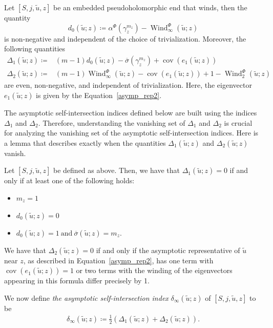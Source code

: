 \documentclass[11pt, a4paper]{amsart}
\DeclareMathOperator{\wind}{Wind}
\DeclareMathOperator{\cov}{cov}
\begin{document}
\begin{lemma} \label{delta1}\cite[Subsection~3.1]{Siefinter2009}
Let $[S,j,\tilde{u},z]$ be an embedded pseudoholomorphic end that winds, then the quantity
$$d_0(\tilde{u} ; z) \coloneqq \alpha^{\Phi}(\gamma_z^{m_z}) -\wind_{\infty}^{\Phi}(\tilde{u}; z)$$
is non-negative and independent of the choice of trivialization. Moreover, the following quantities
\[\begin{array}{ll}
\Delta_1 (\tilde{u}; z)\coloneqq& (m- 1)d_0(\tilde{u}; z)- \overline{\sigma}(\gamma_z^{m_z}) + \cov\left(e_1 (\tilde{u}; z)\right)\\
\Delta_2 (\tilde{u}; z) \coloneqq & (m-1) \wind^{\Phi}_{\infty}(\tilde{u}; z) - \cov\left(e_1 (\tilde{u}; z)\right) + 1 - \wind_2^{\Phi} (\tilde{u}; z)
\end{array}\]
are even, non-negative, and independent of trivialization. Here, the eigenvector $e_1(\tilde{u}; z)$ is given by the Equation~\ref{asymp_rep2}.
\end{lemma}

The asymptotic self-intersection indices defined below are built using the indices $\Delta_1$ and $\Delta_2$. Therefore, understanding the vanishing set of $\Delta_1$ and $\Delta_2$ is crucial for analyzing the vanishing set of the asymptotic self-intersection indices. Here is a lemma that describes exactly when the quantities $\Delta_1 (\tilde{u}; z)$ and $\Delta_2 (\tilde{u}; z)$ vanish. 

\begin{lemma}\cite[Section~3.1]{Siefinter2009} \label{self-intersction=0}
Let $[S,j,\tilde{u},z]$ be defined as above. Then, we have that $\Delta_1 (\tilde{u}; z) = 0$ if and only if at least one of the following holds:
\begin{itemize}[topsep=5pt,itemsep=5pt]
    \item $m_z=1$
    \item $d_0 (\tilde{u}; z) = 0$
    \item $d_0 (\tilde{u}; z) = 1 \mathrm{\ and\ }  \overline{\sigma}(\tilde{u}; z)= m_z.$
\end{itemize}
We have that $\Delta_2 (\tilde{u}; z) = 0$ if and only if the asymptotic representative of $\tilde{u}$ near $z$, as described in Equation~\ref{asymp_rep2}, has one term with $\cov(e_1 (\tilde{u}; z))=1$ or two terms with the winding of the eigenvectors appearing in this formula differ precisely by 1.
\end{lemma}

We now define \textit{the asymptotic self-intersection index} $\delta_{\infty}(\tilde{u}; z)$ of $[S,j,\tilde{u},z]$ to be
\begin{equation*}
    \begin{split}
        \delta_{\infty}(\tilde{u}; z) \coloneqq \frac{1}{2}\left(\Delta_{1} (\tilde{u}; z)+\Delta_2(\tilde{u}; z)\right).
    \end{split}
\end{equation*}
\end{document}
